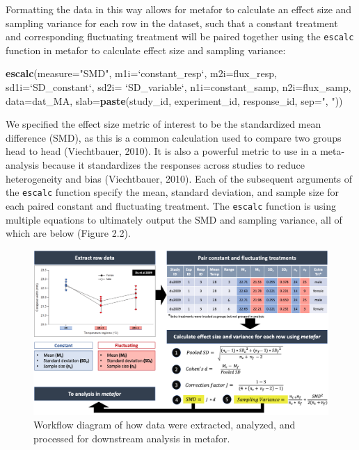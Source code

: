 \documentclass[12pt,twoside]{reedthesis}
\newenvironment{Shaded}{\begin{snugshade}}{\end{snugshade}}
\newcommand{\DataTypeTok}[1]{\textcolor[rgb]{0.13,0.29,0.53}{#1}}
\newcommand{\KeywordTok}[1]{\textcolor[rgb]{0.13,0.29,0.53}{\textbf{#1}}}
\newcommand{\NormalTok}[1]{#1}
\newcommand{\StringTok}[1]{\textcolor[rgb]{0.31,0.60,0.02}{#1}}
\begin{document}
Formatting the data in this way allows for metafor to calculate an effect size and sampling variance for each row in the dataset, such that a constant treatment and corresponding fluctuating treatment will be paired together using the \texttt{escalc} function in metafor to calculate effect size and sampling variance:
\begin{Shaded}
\begin{Highlighting}[]
\KeywordTok{escalc}\NormalTok{(}\DataTypeTok{measure=}\StringTok{"SMD"}\NormalTok{, }\DataTypeTok{m1i=}\StringTok{`}\DataTypeTok{constant_resp}\StringTok{`}\NormalTok{, }\DataTypeTok{m2i=}\NormalTok{flux_resp, }
            \DataTypeTok{sd1i=}\StringTok{`}\DataTypeTok{SD_constant}\StringTok{`}\NormalTok{, }\DataTypeTok{sd2i=} \StringTok{`}\DataTypeTok{SD_variable}\StringTok{`}\NormalTok{, }\DataTypeTok{n1i=}\NormalTok{constant_samp, }
       \DataTypeTok{n2i=}\NormalTok{flux_samp, }\DataTypeTok{data=}\NormalTok{dat_MA, }\DataTypeTok{slab=}\KeywordTok{paste}\NormalTok{(study_id, experiment_id, }
\NormalTok{                                              response_id, }\DataTypeTok{sep=}\StringTok{", "}\NormalTok{))}
\end{Highlighting}
\end{Shaded}
We specified the effect size metric of interest to be the standardized mean difference (SMD), as this is a common calculation used to compare two groups head to head (Viechtbauer, 2010). It is also a powerful metric to use in a meta-analysis because it standardizes the responses across studies to reduce heterogeneity and bias (Viechtbauer, 2010). Each of the subsequent arguments of the \texttt{escalc} function specify the mean, standard deviation, and sample size for each paired constant and fluctuating treatment. The \texttt{escalc} function is using multiple equations to ultimately output the SMD and sampling variance, all of which are below (Figure 2.2).
\begin{figure}
\includegraphics[width=1\linewidth]{figures/figure6} \caption[Workflow of analysis in metafor]{Workflow diagram of how data were extracted, analyzed, and processed for downstream analysis in metafor.}\label{fig:unnamed-chunk-12}
\end{figure}
\end{document}
